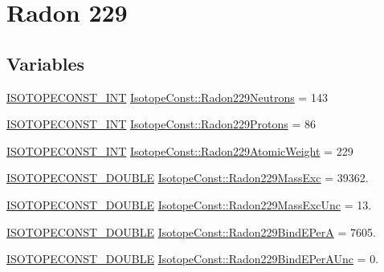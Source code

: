 \hypertarget{group___isotope_const-_radon-_rn229}{}\section{Radon 229}
\label{group___isotope_const-_radon-_rn229}
\subsection*{Variables}
\begin{DoxyCompactItemize}
\item 
\mbox{\hyperlink{group___isotope_const-_macros_ga5f18360b3e99483a35c32d789e62621c}{I\+S\+O\+T\+O\+P\+E\+C\+O\+N\+S\+T\+\_\+\+I\+NT}} \mbox{\hyperlink{group___isotope_const-_radon-_rn229_gae2b252b3c65445a373412087db1992b8}{Isotope\+Const\+::\+Radon229\+Neutrons}} = 143
\item 
\mbox{\hyperlink{group___isotope_const-_macros_ga5f18360b3e99483a35c32d789e62621c}{I\+S\+O\+T\+O\+P\+E\+C\+O\+N\+S\+T\+\_\+\+I\+NT}} \mbox{\hyperlink{group___isotope_const-_radon-_rn229_gac0882dcd76a4a1332bc20c5a4e4a1731}{Isotope\+Const\+::\+Radon229\+Protons}} = 86
\item 
\mbox{\hyperlink{group___isotope_const-_macros_ga5f18360b3e99483a35c32d789e62621c}{I\+S\+O\+T\+O\+P\+E\+C\+O\+N\+S\+T\+\_\+\+I\+NT}} \mbox{\hyperlink{group___isotope_const-_radon-_rn229_ga999b5aa80084aafd49f29608b0b76104}{Isotope\+Const\+::\+Radon229\+Atomic\+Weight}} = 229
\item 
\mbox{\hyperlink{group___isotope_const-_macros_ga8f45a7272ce02c0b4c65c44636ed719a}{I\+S\+O\+T\+O\+P\+E\+C\+O\+N\+S\+T\+\_\+\+D\+O\+U\+B\+LE}} \mbox{\hyperlink{group___isotope_const-_radon-_rn229_gabd89ee7fbd4e737fd8f373d4c4c9d2dc}{Isotope\+Const\+::\+Radon229\+Mass\+Exc}} = 39362.
\item 
\mbox{\hyperlink{group___isotope_const-_macros_ga8f45a7272ce02c0b4c65c44636ed719a}{I\+S\+O\+T\+O\+P\+E\+C\+O\+N\+S\+T\+\_\+\+D\+O\+U\+B\+LE}} \mbox{\hyperlink{group___isotope_const-_radon-_rn229_ga8bac571463a7d9f30547ab19f735fe43}{Isotope\+Const\+::\+Radon229\+Mass\+Exc\+Unc}} = 13.
\item 
\mbox{\hyperlink{group___isotope_const-_macros_ga8f45a7272ce02c0b4c65c44636ed719a}{I\+S\+O\+T\+O\+P\+E\+C\+O\+N\+S\+T\+\_\+\+D\+O\+U\+B\+LE}} \mbox{\hyperlink{group___isotope_const-_radon-_rn229_gab9a7cb63756652c182de3aaf0012ff81}{Isotope\+Const\+::\+Radon229\+Bind\+E\+PerA}} = 7605.
\item 
\mbox{\hyperlink{group___isotope_const-_macros_ga8f45a7272ce02c0b4c65c44636ed719a}{I\+S\+O\+T\+O\+P\+E\+C\+O\+N\+S\+T\+\_\+\+D\+O\+U\+B\+LE}} \mbox{\hyperlink{group___isotope_const-_radon-_rn229_ga2f28cf1883629ee9f20fd72c17f5d88b}{Isotope\+Const\+::\+Radon229\+Bind\+E\+Per\+A\+Unc}} = 0.

\end{DoxyCompactItemize}
